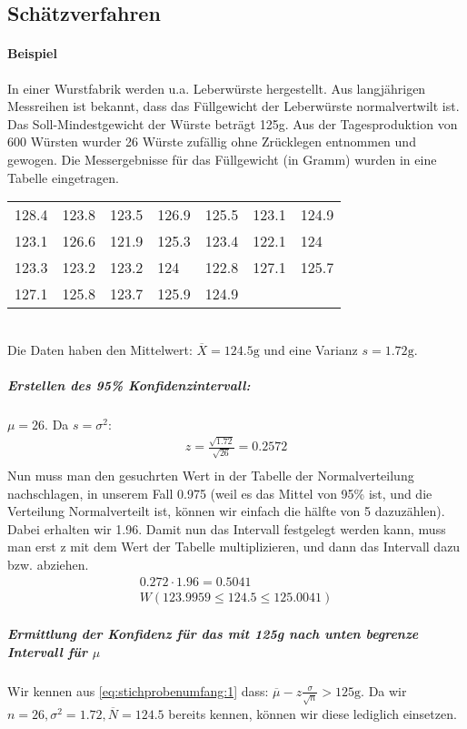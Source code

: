 \subsection{Schätzverfahren}
\paragraph{Beispiel} In einer Wurstfabrik werden u.a. Leberwürste hergestellt. Aus langjährigen Messreihen ist bekannt, dass das Füllgewicht der Leberwürste normalvertwilt ist. Das Soll-Mindestgewicht der Würste beträgt 125g. Aus der Tagesproduktion von 600 Würsten wurder 26 Würste zufällig ohne Zrücklegen entnommen und gewogen. Die Messergebnisse für das Füllgewicht (in Gramm) wurden in eine Tabelle eingetragen.
\begin{table}[ht]
\centering
\begin{tabular}{@{}lllllll@{}}
\toprule
128.4 & 123.8 & 123.5 & 126.9 & 125.5 & 123.1 & 124.9 \\
123.1 & 126.6 & 121.9 & 125.3 & 123.4 & 122.1 & 124   \\
123.3 & 123.2 & 123.2 & 124   & 122.8 & 127.1 & 125.7 \\
127.1 & 125.8 & 123.7 & 125.9 & 124.9 &       &       \\ \bottomrule
\end{tabular}
\end{table}\\
Die Daten haben den Mittelwert: $ \overline{X}=124.5\text{g}$ und eine Varianz $s=1.72\text{g}$.
\subparagraph{Erstellen des 95\% Konfidenzintervall:} $\mu = 26$. Da $s = \sigma^2$:
\begin{align*}
z = \frac{\sqrt{1.72}}{\sqrt{26}} = 0.2572 \\
\end{align*}
Nun muss man den gesuchrten Wert in der Tabelle der Normalverteilung nachschlagen, in unserem Fall 0.975 (weil es das Mittel von 95\% ist, und die Verteilung Normalverteilt ist, können wir einfach die hälfte von 5 dazuzählen). Dabei erhalten wir 1.96. Damit nun das Intervall festgelegt werden kann, muss man erst z mit dem Wert der Tabelle multiplizieren, und dann das Intervall dazu bzw. abziehen.
\begin{align*}
0.272 \cdot 1.96 = 0.5041 \\
W(123.9959\leq124.5\leq125.0041)
\end{align*}
\subparagraph{Ermittlung der Konfidenz für das mit 125g nach unten begrenze Intervall für $\mu$}
Wir kennen aus \autoref{eq:stichprobenumfang:1} dass: $ \overline{\mu}-z\frac{\sigma}{\sqrt{n}} > 125\text{g}$. Da wir $n=26, \sigma^2=1.72, \overline{N}=124.5$ bereits kennen, können wir diese lediglich einsetzen.
